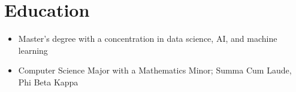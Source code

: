 \documentclass{my_cv}
\begin{document}
\makecvtitle

\section{Education \faBook} 
\begin{itemize}
\item Master's degree with a concentration in data science, AI, and machine
  learning
\end{itemize}
\begin{itemize}
\item Computer Science Major with a Mathematics Minor;  Summa
  Cum Laude, Phi Beta Kappa
\end{itemize}
\end{document}
